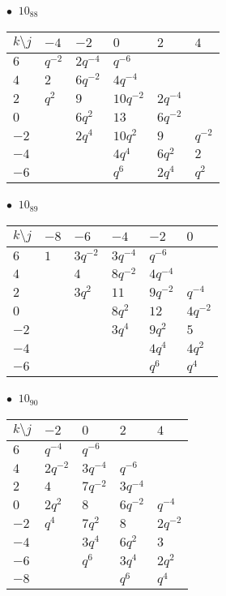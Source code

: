 \begin{minipage}{\linewidth}
$\bullet\ $ $10_{88}$ \vspace{0.5em} \\
\begin{tabular}{l|lllll}
$k \setminus j$ & $-4$ & $-2$ & $0$ & $2$ & $4$ \\
\hline
$6$ & $q^{-2}$ & $2q^{-4}$ & $q^{-6}$ &  &  \\
$4$ & $2$ & $6q^{-2}$ & $4q^{-4}$ &  &  \\
$2$ & $q^{2}$ & $9$ & $10q^{-2}$ & $2q^{-4}$ &  \\
$0$ &  & $6q^{2}$ & $13$ & $6q^{-2}$ &  \\
$-2$ &  & $2q^{4}$ & $10q^{2}$ & $9$ & $q^{-2}$ \\
$-4$ &  &  & $4q^{4}$ & $6q^{2}$ & $2$ \\
$-6$ &  &  & $q^{6}$ & $2q^{4}$ & $q^{2}$ \\
\end{tabular}
\vspace{2em}
\end{minipage}
%
\begin{minipage}{\linewidth}
$\bullet\ $ $10_{89}$ \vspace{0.5em} \\
\begin{tabular}{l|lllll}
$k \setminus j$ & $-8$ & $-6$ & $-4$ & $-2$ & $0$ \\
\hline
$6$ & $1$ & $3q^{-2}$ & $3q^{-4}$ & $q^{-6}$ &  \\
$4$ &  & $4$ & $8q^{-2}$ & $4q^{-4}$ &  \\
$2$ &  & $3q^{2}$ & $11$ & $9q^{-2}$ & $q^{-4}$ \\
$0$ &  &  & $8q^{2}$ & $12$ & $4q^{-2}$ \\
$-2$ &  &  & $3q^{4}$ & $9q^{2}$ & $5$ \\
$-4$ &  &  &  & $4q^{4}$ & $4q^{2}$ \\
$-6$ &  &  &  & $q^{6}$ & $q^{4}$ \\
\end{tabular}
\vspace{2em}
\end{minipage}
%
\begin{minipage}{\linewidth}
$\bullet\ $ $10_{90}$ \vspace{0.5em} \\
\begin{tabular}{l|llll}
$k \setminus j$ & $-2$ & $0$ & $2$ & $4$ \\
\hline
$6$ & $q^{-4}$ & $q^{-6}$ &  &  \\
$4$ & $2q^{-2}$ & $3q^{-4}$ & $q^{-6}$ &  \\
$2$ & $4$ & $7q^{-2}$ & $3q^{-4}$ &  \\
$0$ & $2q^{2}$ & $8$ & $6q^{-2}$ & $q^{-4}$ \\
$-2$ & $q^{4}$ & $7q^{2}$ & $8$ & $2q^{-2}$ \\
$-4$ &  & $3q^{4}$ & $6q^{2}$ & $3$ \\
$-6$ &  & $q^{6}$ & $3q^{4}$ & $2q^{2}$ \\
$-8$ &  &  & $q^{6}$ & $q^{4}$ \\
\end{tabular}
\vspace{2em}
\end{minipage}
